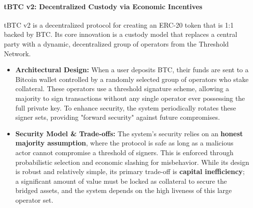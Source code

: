 \documentclass{DESSThesis}
\begin{document}
\paragraph{tBTC v2: Decentralized Custody via Economic Incentives}
tBTC v2 \cite{noauthor_tbtc_2025} is a decentralized protocol for creating an ERC-20 token that is 1:1 backed by BTC. Its core innovation is a custody model that replaces a central party with a dynamic, decentralized group of operators from the Threshold Network.
\begin{itemize}
    \item \textbf{Architectural Design:} When a user deposits BTC, their funds are sent to a Bitcoin wallet controlled by a randomly selected group of operators who stake collateral. These operators use a threshold signature scheme, allowing a majority to sign transactions without any single operator ever possessing the full private key. To enhance security, the system periodically rotates these signer sets, providing "forward security" against future compromises.
    \item \textbf{Security Model \& Trade-offs:} The system's security relies on an \textbf{honest majority assumption}, where the protocol is safe as long as a malicious actor cannot compromise a threshold of signers. This is enforced through probabilistic selection and economic slashing for misbehavior. While its design is robust and relatively simple, its primary trade-off is \textbf{capital inefficiency}; a significant amount of value must be locked as collateral to secure the bridged assets, and the system depends on the high liveness of this large operator set.
\end{itemize}
\end{document}

